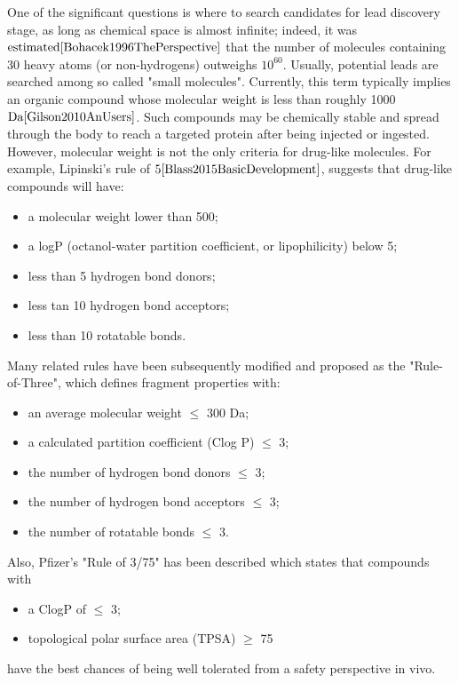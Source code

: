 One of the significant questions is where to search candidates for lead discovery 
stage, as long as chemical space is almost infinite; indeed, it was $\text{estimated}{\cite{Bohacek1996ThePerspective}}$  
that the number of molecules containing 30 heavy atoms (or non-hydrogens) outweighs 
$10^{60}$.
Usually, potential leads are searched among so called "small molecules".
Currently, this term typically implies an organic compound whose molecular weight 
is less than roughly 1000 $\text{Da}{\cite{Gilson2010AnUsers}}$.
Such compounds may be chemically stable and spread through the body to reach a targeted 
protein after being injected or ingested.
However, molecular weight is not the only criteria for drug-like molecules.
For example, Lipinski's rule  of $5{\cite{Blass2015BasicDevelopment}}$, suggests 
that drug-like compounds will have:
\begin{itemize}
    \item a molecular weight lower than 500;
    \item a logP (octanol-water partition coefficient, or lipophilicity) below 5;
    \item less than 5 hydrogen bond donors;
    \item less tan 10 hydrogen bond acceptors;
    \item less than 10 rotatable bonds.
\end{itemize}
Many related rules have been subsequently modified and proposed as the "Rule-of-Three", 
which defines fragment properties with:
\begin{itemize} 
    \item an average molecular weight $\leq$ 300 Da;
    \item a calculated partition coefficient (Clog P) $\leq$ 3;
    \item the number of hydrogen bond donors $\leq$ 3;
    \item the number of hydrogen bond acceptors $\leq$ 3;
    \item the number of rotatable bonds $\leq$ 3.
\end{itemize}
Also, Pfizer's "Rule of 3/75" has been described which states that compounds with
\begin{itemize}
    \item a ClogP of $\leq$ 3;
    \item topological polar surface area (TPSA) $\ge$ 75
\end{itemize}
have the best chances of being well tolerated from a safety perspective in vivo.
\hfill\break\\
